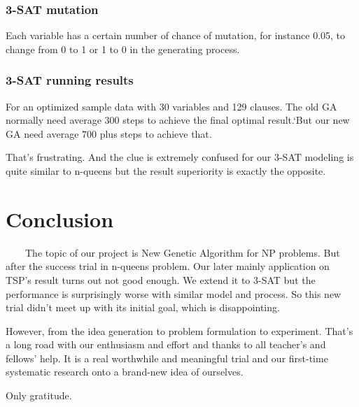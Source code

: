 \documentclass{acmtog} %
\begin{document}
\subsubsection{3-SAT mutation}
\label{subsubsec:3satmutation}
\qquad

Each variable has a certain number of chance of mutation, for instance 0.05, to change from 0 to 1 or 1 to 0 in the generating process.

\subsubsection{3-SAT running results}
\label{subsubsec:3satresults}
\qquad

For an optimized sample data with 30 variables and 129 clauses. The old GA normally need average 300 steps to achieve the final optimal result.`But our new GA need average 700 plus steps to achieve that.

That's frustrating. And the clue is extremely confused for our 3-SAT modeling is quite similar to n-queens but the result superiority is exactly the opposite.


\section{Conclusion}
\label{sec:conclusion}
%
\ \ \ \ The topic of our project is New Genetic Algorithm for NP problems. But after the success trial in n-queens problem. Our later mainly application on TSP's result turns out not good enough. We extend it to 3-SAT but the performance is surprisingly worse with similar model and process. So this new trial didn't meet up with its initial goal, which is disappointing. 

However, from the idea generation to problem formulation to experiment. That's a long road with our enthusiasm and effort and thanks to all teacher's and fellows' help. It is a real worthwhile and meaningful trial and our first-time systematic research onto a brand-new idea of ourselves.

Only gratitude.
\end{document}
